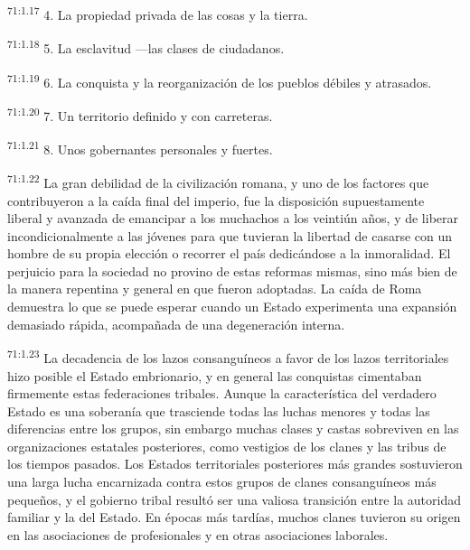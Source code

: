 \par
\textsuperscript{71:1.17} 4. La propiedad privada de las cosas y la tierra.

\par
\textsuperscript{71:1.18} 5. La esclavitud ---las clases de ciudadanos.

\par
\textsuperscript{71:1.19} 6. La conquista y la reorganización de los pueblos débiles y atrasados.

\par
\textsuperscript{71:1.20} 7. Un territorio definido y con carreteras.

\par
\textsuperscript{71:1.21} 8. Unos gobernantes personales y fuertes.

\par
\textsuperscript{71:1.22} La gran debilidad de la civilización romana, y uno de los factores que contribuyeron a la caída final del imperio, fue la disposición supuestamente liberal y avanzada de emancipar a los muchachos a los veintiún años, y de liberar incondicionalmente a las jóvenes para que tuvieran la libertad de casarse con un hombre de su propia elección o recorrer el país dedicándose a la inmoralidad. El perjuicio para la sociedad no provino de estas reformas mismas, sino más bien de la manera repentina y general en que fueron adoptadas. La caída de Roma demuestra lo que se puede esperar cuando un Estado experimenta una expansión demasiado rápida, acompañada de una degeneración interna.

\par
\textsuperscript{71:1.23} La decadencia de los lazos consanguíneos a favor de los lazos territoriales hizo posible el Estado embrionario, y en general las conquistas cimentaban firmemente estas federaciones tribales. Aunque la característica del verdadero Estado es una soberanía que trasciende todas las luchas menores y todas las diferencias entre los grupos, sin embargo muchas clases y castas sobreviven en las organizaciones estatales posteriores, como vestigios de los clanes y las tribus de los tiempos pasados. Los Estados territoriales posteriores más grandes sostuvieron una larga lucha encarnizada contra estos grupos de clanes consanguíneos más pequeños, y el gobierno tribal resultó ser una valiosa transición entre la autoridad familiar y la del Estado. En épocas más tardías, muchos clanes tuvieron su origen en las asociaciones de profesionales y en otras asociaciones laborales.

